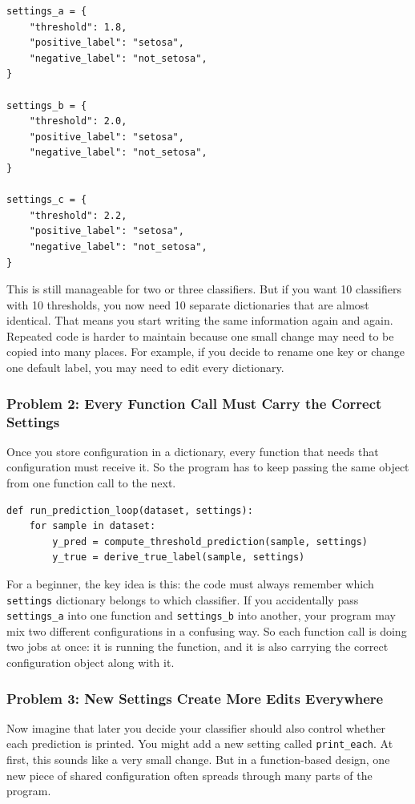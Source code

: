 \begin{verbatim}
settings_a = {
    "threshold": 1.8,
    "positive_label": "setosa",
    "negative_label": "not_setosa",
}

settings_b = {
    "threshold": 2.0,
    "positive_label": "setosa",
    "negative_label": "not_setosa",
}

settings_c = {
    "threshold": 2.2,
    "positive_label": "setosa",
    "negative_label": "not_setosa",
}
\end{verbatim}

\noindent
This is still manageable for two or three classifiers.
But if you want 10 classifiers with 10 thresholds, you now need 10 separate dictionaries that are almost identical.
That means you start writing the same information again and again.
Repeated code is harder to maintain because one small change may need to be copied into many places.
For example, if you decide to rename one key or change one default label, you may need to edit every dictionary.

\subsubsection{Problem 2: Every Function Call Must Carry the Correct Settings}
Once you store configuration in a dictionary, every function that needs that configuration must receive it.
So the program has to keep passing the same object from one function call to the next.

\begin{verbatim}
def run_prediction_loop(dataset, settings):
    for sample in dataset:
        y_pred = compute_threshold_prediction(sample, settings)
        y_true = derive_true_label(sample, settings)
\end{verbatim}

\noindent
For a beginner, the key idea is this: the code must always remember which \texttt{settings} dictionary belongs to which classifier.
If you accidentally pass \texttt{settings\_a} into one function and \texttt{settings\_b} into another, your program may mix two different configurations in a confusing way.
So each function call is doing two jobs at once:
it is running the function, and it is also carrying the correct configuration object along with it.

\subsubsection{Problem 3: New Settings Create More Edits Everywhere}
Now imagine that later you decide your classifier should also control whether each prediction is printed.
You might add a new setting called \texttt{print\_each}.
At first, this sounds like a very small change.
But in a function-based design, one new piece of shared configuration often spreads through many parts of the program.

